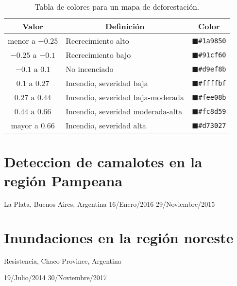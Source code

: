 \begin{enumerate}
\begin{table}[]
\centering
\begin{tabular}{@{}cll@{}}
\toprule
Valor & \multicolumn{1}{c}{Definición}        & \multicolumn{1}{c}{Color}          \\ \midrule
menor a $-0.25$      & Recrecimiento alto & \textcolor{NB1}{$\blacksquare$}\texttt{\#1a9850} \\
$-0.25$ a $-0.1$      & Recrecimiento bajo   & \textcolor{NB2}{$\blacksquare$}\texttt{\#91cf60} \\
$-0.1$ a $0.1$      & No incenciado        & \textcolor{NB3}{$\blacksquare$}\texttt{\#d9ef8b} \\
$0.1$ a $0.27$     & Incendio, severidad baja        & \textcolor{NB4}{$\blacksquare$}\texttt{\#ffffbf} \\
$0.27$ a $0.44$     & Incendio, severidad baja-moderada        & \textcolor{NB5}{$\blacksquare$}\texttt{\#fee08b} \\
$0.44$ a $0.66$     & Incendio, severidad moderada-alta        & \textcolor{NB6}{$\blacksquare$}\texttt{\#fc8d59} \\
mayor a $0.66$     & Incendio, severidad alta        & \textcolor{NB7}{$\blacksquare$}\texttt{\#d73027} \\ \bottomrule
\end{tabular}
\caption{Tabla de colores para un mapa de deforestación.}
\label{tab:inc}
\end{table}
\end{enumerate}
\section{Deteccion de camalotes en la región Pampeana}

La Plata, Buenos Aires, Argentina
16/Enero/2016
29/Noviembre/2015

\section{Inundaciones en la región noreste}

Resistencia, Chaco Province, Argentina

19/Julio/2014
30/Noviembre/2017
